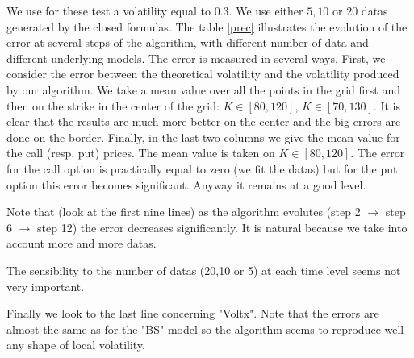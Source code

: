 \documentclass[a4paper]{article}
\begin{document}
We use for these test a volatility equal to $0.3$. We use either
$5,10$ or $20$ datas generated by the closed formulas. The table
\ref{prec} illustrates the evolution of the error at several steps
of the algorithm, with different number of data and different
underlying models. The error is measured in several ways. First,
we consider the error between the theoretical volatility and the
volatility produced by our algorithm. We take a mean value over
all the points in the grid first and then on the strike in the
center of the grid: $ K\in [80,120]$, $K \in [70,130]$. It is
clear that the results are much more better on the center and the
big errors are done on the border. Finally, in the last two
columns we give the mean value for the call (resp. put) prices.
The mean value is taken on $K \in [80,120]$. The error for the
call option is practically equal to zero (we fit the datas) but
for the put option this error becomes significant. Anyway it
remains at a good level.

Note that (look at the first nine lines) as the algorithm
evolutes (step 2 $\rightarrow$ step 6 $\rightarrow$ step 12) the
error decreases significantly. It is natural because we take into
account more and more datas.

The sensibility to the number of datas (20,10 or 5) at each time
level seems not very important.

Finally we look to the last line concerning "Voltx". Note that
the errors are almost the same as for the "BS" model so the
algorithm seems to reproduce well any shape of local volatility.
\end{document}
